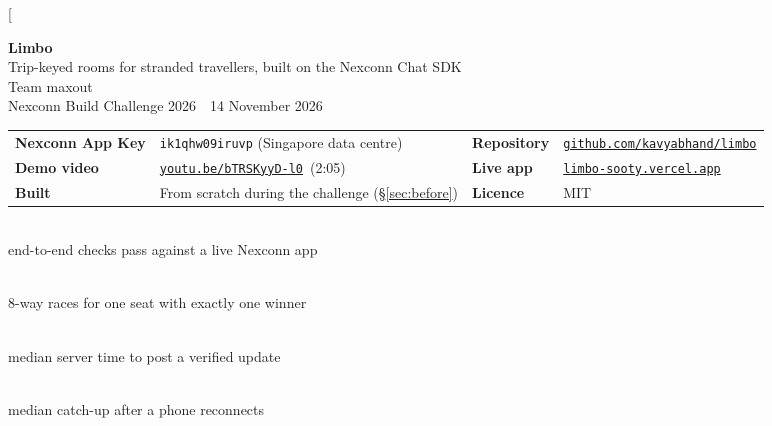 \documentclass[10pt,twocolumn]{article}
\newcommand{\RepoURL}{https://github.com/kavyabhand/limbo}
\newcommand{\VideoURL}{https://youtu.be/bTRSKyyD-l0}
\newcommand{\LiveURL}{https://limbo-sooty.vercel.app}
\newcommand{\AppKey}{ik1qhw09iruvp}
\newcommand{\code}[1]{\texttt{\small #1}}
\newcommand{\stat}[2]{\begin{minipage}[t]{0.235\textwidth}\centering{\fontsize{22}{24}\selectfont\bfseries #1}\\[2pt]{\small\color{ink2}#2}\end{minipage}}
\begin{document}
\twocolumn[{%
\begin{center}
  {\fontsize{24}{28}\selectfont\bfseries Limbo}\\[4pt]
  {\Large Trip-keyed rooms for stranded travellers, built on the Nexconn Chat SDK}\\[10pt]
  {\normalsize Team maxout}\\[2pt]
  {\small\color{ink2}Nexconn Build Challenge 2026 \,\textperiodcentered\, 14 November 2026}
\end{center}
\vspace{4pt}
\begin{tcolorbox}[colback=subtle,colframe=subtle,arc=4pt,left=10pt,right=10pt,top=6pt,bottom=6pt]
\small
\begin{tabularx}{\textwidth}{@{}l X l X@{}}
\textbf{Nexconn App Key} & \code{\AppKey} (Singapore data centre) & \textbf{Repository} & \href{\RepoURL}{\code{github.com/kavyabhand/limbo}} \\
\textbf{Demo video} & \href{\VideoURL}{\code{youtu.be/bTRSKyyD-l0}} \,(2:05) & \textbf{Live app} & \href{\LiveURL}{\code{limbo-sooty.vercel.app}} \\
\textbf{Built} & From scratch during the challenge (\S\ref{sec:before}) & \textbf{Licence} & MIT \\
\end{tabularx}
\end{tcolorbox}
\vspace{2pt}
\begin{center}
\stat{58/58}{end-to-end checks pass against a live Nexconn app}\hfill
\stat{30/30}{8-way races for one seat with exactly one winner}\hfill
\stat{94\,ms}{median server time to post a verified update}\hfill
\stat{0.8\,s}{median catch-up after a phone reconnects}
\end{center}
\vspace{6pt}
\begin{abstract}
\noindent When a flight is cancelled or a train stalls in fog, hundreds of people share the same problem and have no
way to reach each other. No one can create the group: strangers do not have each other's numbers, and the operator's
channels are one-way. We observe that a trip already has a public, shared key, its number and date, so a room for it
can exist \emph{before anyone joins}. Limbo maps every flight, train and bus to a Nexconn community channel that is
created on first visit; anyone who types the same trip number lands in the same room with no app and no sign-up.

\end{abstract}}
\end{document}
